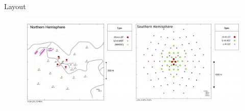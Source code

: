 \documentclass[aspectratio=1610, 9pt]{beamer}
\begin{document}
\begin{frame}{Layout}
      \begin{figure}
      \centering
       \includegraphics[width=\textwidth]{images/cta_layout.png}
      \end{figure}
\end{frame}
\end{document}
